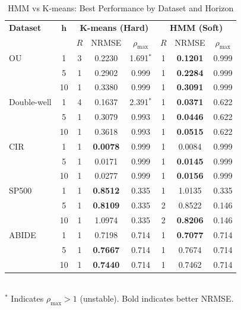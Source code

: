 \begin{table}[h!]
\centering
\caption{HMM vs K-means: Best Performance by Dataset and Horizon}
\label{tab:hmm-kmeans-comparison-final}
\begin{tabular}{lc|ccc|ccc}
\toprule
\textbf{Dataset} & $\mathbf{h}$ & \multicolumn{3}{c|}{\textbf{K-means (Hard)}} & \multicolumn{3}{c}{\textbf{HMM (Soft)}} \\
 & & $R$ & NRMSE & $\rho_{\max}$ & $R$ & NRMSE & $\rho_{\max}$ \\
\midrule
OU & 1 & 3 & 0.2230 & 1.691$^*$ & 1 & \textbf{0.1201} & 0.999 \\
 & 5 & 1 & 0.2902 & 0.999 & 1 & \textbf{0.2284} & 0.999 \\
 & 10 & 1 & 0.3380 & 0.999 & 1 & \textbf{0.3091} & 0.999 \\
\midrule
Double-well & 1 & 4 & 0.1637 & 2.391$^*$ & 1 & \textbf{0.0371} & 0.622 \\
 & 5 & 1 & 0.3079 & 0.993 & 1 & \textbf{0.0446} & 0.622 \\
 & 10 & 1 & 0.3618 & 0.993 & 1 & \textbf{0.0515} & 0.622 \\
\midrule
CIR & 1 & 1 & \textbf{0.0078} & 0.999 & 1 & 0.0084 & 0.999 \\
 & 5 & 1 & 0.0171 & 0.999 & 1 & \textbf{0.0145} & 0.999 \\
 & 10 & 1 & 0.0277 & 0.999 & 1 & \textbf{0.0156} & 0.999 \\
\midrule
SP500 & 1 & 1 & \textbf{0.8512} & 0.335 & 1 & 1.0135 & 0.335 \\
 & 5 & 1 & \textbf{0.8109} & 0.335 & 2 & 0.8522 & 0.146 \\
 & 10 & 1 & 1.0974 & 0.335 & 2 & \textbf{0.8206} & 0.146 \\
\midrule
ABIDE & 1 & 1 & 0.7198 & 0.714 & 1 & \textbf{0.7077} & 0.714 \\
 & 5 & 1 & \textbf{0.7667} & 0.714 & 1 & 0.7674 & 0.714 \\
 & 10 & 1 & \textbf{0.7440} & 0.714 & 1 & 0.7462 & 0.714 \\
\bottomrule
\end{tabular}
\vspace{0.1cm}\\
\footnotesize{$^*$ Indicates $\rho_{\max} > 1$ (unstable). Bold indicates better NRMSE.}
\end{table}